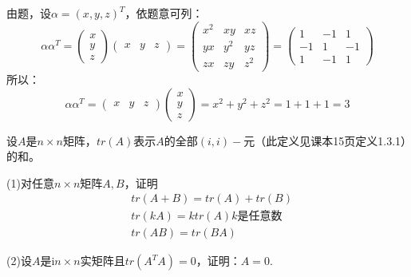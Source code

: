 \documentclass[a4paper]{report}
\begin{document}
\begin{jie}
由题，设$\alpha=(x,y,z)^T$，依题意可列：
\begin{equation*}
\alpha\alpha^T=
\begin{pmatrix}
x\\ y\\z
\end{pmatrix}\begin{pmatrix}
x& y&z
\end{pmatrix}=\begin{pmatrix}
x^2 & xy & xz\\
yx & y^2 & yz\\
zx & zy & z^2
\end{pmatrix}=\begin{pmatrix}
1&-1&1\\
-1&1&-1\\
1&-1&1
\end{pmatrix}
\end{equation*}
所以：
\begin{equation*}
\alpha\alpha^T=\begin{pmatrix}
x& y&z
\end{pmatrix}\begin{pmatrix}
x\\ y\\z
\end{pmatrix}=x^2+y^2+z^2=1+1+1=3
\end{equation*}
\end{jie}

\EX 设$A$是$n\times n$矩阵，$tr(A)$表示$A$的全部$(i,i)-$元（此定义见课本15页定义1.3.1）的和。

(1)对任意$n\times n$矩阵$A,B$，证明
\begin{align*}
&tr(A+B)=tr(A)+tr(B)\\
&tr(kA)=k tr(A)\text{$k$是任意数}\\
&tr(AB)=tr(BA)
\end{align*}

(2)设$A$是i$n\times n$实矩阵且$tr(A^TA)=0$，证明：$A=0$.
\end{document}
